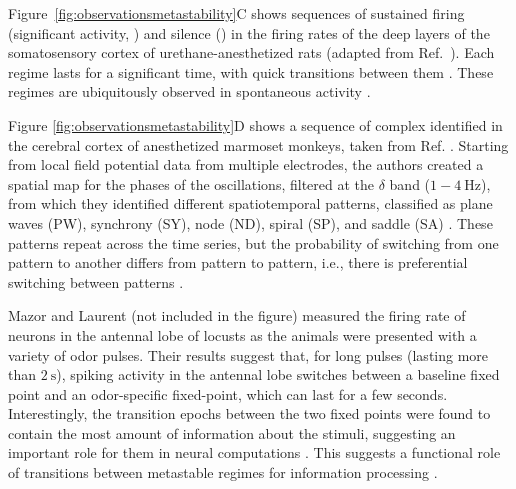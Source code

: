 Figure~\ref{fig:observationsmetastability}C shows sequences of sustained firing (significant activity, ) and silence () in the firing rates of the deep layers of the somatosensory cortex of urethane-anesthetized rats (adapted from Ref.~\cite{jercog2017updown}). Each regime lasts for a significant time, with quick transitions between them \cite{jercog2017updown}. These regimes are ubiquitously observed in spontaneous activity \cite{luczak2007sequential, jercog2017updown}. 

Figure \ref{fig:observationsmetastability}D shows a sequence of complex  identified in the cerebral cortex of anesthetized marmoset monkeys, taken from Ref. \cite{townsend2015emergence}. Starting from local field potential data from multiple electrodes, the authors created a spatial map for the phases of the oscillations, filtered at the $\delta$ band ($1-\SI{4}{\hertz}$), from which they identified different spatiotemporal patterns, classified as plane waves (PW), synchrony (SY), node (ND), spiral (SP), and saddle (SA) \cite{townsend2015emergence}. These patterns repeat across the time series, but the probability of switching from one pattern to another differs from pattern to pattern, i.e., there is preferential switching between patterns \cite{townsend2015emergence}.

Mazor and Laurent \cite{mazor2005transient} (not included in the figure) measured the firing rate of neurons in the antennal lobe of locusts as the animals were presented with a variety of odor pulses. Their results suggest that, for long pulses (lasting more than $\SI{2}{\second}$), spiking activity in the antennal lobe switches between a baseline fixed point and an odor-specific fixed-point, which can last for a few seconds. Interestingly, the transition epochs between the two fixed points were found to contain the most amount of information about the stimuli, suggesting an important role for them in neural computations \cite{mazor2005transient, rabinovich2008transientdynamics}. This suggests a functional role of transitions between metastable regimes for information processing \cite{mazor2005transient, ashwin2005when}.

